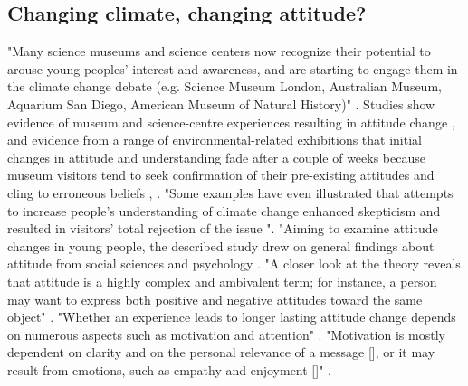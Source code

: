 \subsection{Changing climate, changing attitude?}
"Many science museums and science centers now recognize their potential to arouse young peoples’ interest and awareness, and are starting to engage them in the climate change debate (e.g. Science Museum London, Australian Museum, Aquarium San Diego, American Museum of Natural History)" \autocite[p. 95]{gorr_changing_2014}. Studies show evidence of museum and science-centre experiences resulting in attitude change \autocite{smithsonian_2011}, and evidence from a range of environmental-related exhibitions that initial changes in attitude and understanding fade after a couple of weeks because museum visitors tend to seek confirmation of their pre-existing attitudes and cling to erroneous beliefs \autocite{Adelman_2000}, \autocite{Cakir_2008}. "Some examples have even illustrated that attempts to increase people’s understanding of climate change enhanced skepticism and resulted in visitors’ total rejection of the issue \autocite{guardian_2009}". "Aiming to examine attitude changes in young people, the described study drew on general findings about attitude from social sciences and psychology \autocite[p. 96]{gorr_changing_2014}. "A closer look at the theory reveals that attitude is a highly complex and ambivalent term; for instance, a person may want to express both positive and negative attitudes toward the same object" \autocite[p. 96]{gorr_changing_2014}. "Whether an experience leads to longer lasting attitude change depends on numerous aspects such as motivation and attention" \autocite[p. 96]{gorr_changing_2014}. "Motivation is mostly dependent on clarity and on the personal relevance of a message [\autocite{salazar_mediations_2011}], or it may result from emotions, such as empathy and enjoyment [\autocite{Roberts_1997}]" \autocite[p. 96]{gorr_changing_2014}.


